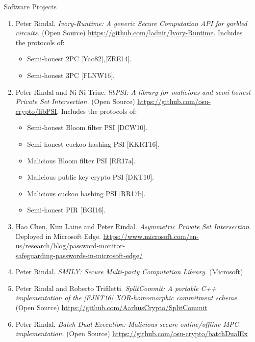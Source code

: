 \documentclass{resume} %
\begin{document}
\begin{rSection}{Software Projects}
\begin{enumerate}[label=S\arabic* --]
		\item Peter Rindal. \emph{Ivory-Runtime: A generic Secure Computation API for garbled circuits.} (Open Source)  \url{https://github.com/ladnir/Ivory-Runtime}. Includes the protocols of:
		\begin{itemize}
			\item Semi-honest 2PC [Yao82],[ZRE14].
			\item Semi-honest 3PC [FLNW16].
		\end{itemize}
		
		\item Peter Rindal and Ni Ni Triue. \emph{libPSI: A library for malicious and semi-honest Private Set Intersection.} (Open Source) \url{https://github.com/osu-crypto/libPSI}. Includes the protocols of:
		\begin{itemize}		
		\item Semi-honest Bloom filter PSI [DCW10]. 
		\item Semi-honest cuckoo hashing PSI [KKRT16]. 
		\item Malicious Bloom filter PSI [RR17a]. 
		\item Malicious public key crypto PSI [DKT10]. 
		\item Malicious cuckoo hashing PSI [RR17b]. 
		\item Semi-honest PIR [BGI16].		
	\end{itemize}

	\item Hao Chen, Kim Laine and Peter Rindal. \emph{Asymmetric Private Set Intersection}. Deployed in Microsoft Edge. \url{https://www.microsoft.com/en-us/research/blog/password-monitor-}\\ \url{safeguarding-passwords-in-microsoft-edge/}
	
	\item Peter Rindal. \emph{SMILY: Secure Multi-party Computation Library.} (Microsoft).

	\item Peter Rindal and Roberto Trifiletti. \emph{SplitCommit: A portable C++ implementation of the [FJNT16] XOR-homomorphic commitment scheme.} (Open Source) \url{https://github.com/AarhusCrypto/SplitCommit}
	
	\item Peter Rindal. \emph{Batch Dual Execution: Malicious secure online/offline MPC implementation.}  (Open Source) \url{https://github.com/osu-crypto/batchDualEx}
	\end{enumerate}
	
\end{rSection}
\end{document}
